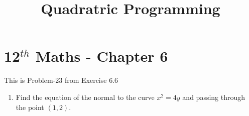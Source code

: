 \documentclass[12pt]{article}
\begin{document}
\begin{center}
	\title{\textbf{Quadratric Programming}}
\date{\vspace{-5ex}} %
\maketitle
\end{center}
\setcounter{page}{1}

\section{12$^{th}$ Maths - Chapter 6}
This is Problem-23 from Exercise 6.6 
\begin{enumerate}
	\item Find the equation of the normal to the curve $x^2=4y$ and passing through the point $(1,2)$.


\end{enumerate}
\end{document}
